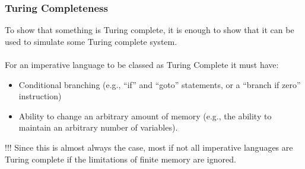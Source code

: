 \begin{frame}
	\frametitle{Turing Completeness}
	
	To show that something is Turing complete, it is enough to show that it can be used to simulate some Turing complete system. 	\\ ~ \\
	For an imperative language to be classed as Turing Complete it must have:

	\begin{itemize}
		\item Conditional branching (e.g., ``if'' and ``goto'' statements, or a ``branch if zero'' instruction)
		\item Ability to change an arbitrary amount of memory (e.g., the ability to maintain an arbitrary number of variables).
	\end{itemize}
\end{frame}

\begin{frame}
	!!! Since this is almost always the case, most if not all imperative languages are Turing complete if the limitations of finite memory are ignored.
\end{frame}



